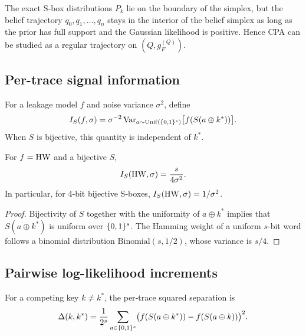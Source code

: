 The exact S‑box distributions $P_k$ lie on the boundary of the simplex, but
the belief trajectory $q_0,q_1,\ldots,q_n$ stays in the interior of the belief
simplex as long as the prior has full support and the Gaussian likelihood is
positive.  Hence CPA can be studied as a regular trajectory on $(Q,g_F^{(Q)})$.

\subsection{Per-trace signal information}\label{subsec:per-trace}

\begin{definition}\label{def:per-trace}
  For a leakage model $f$ and noise variance $\sigma^2$, define
  \begin{equation}\label{eq:per-trace-def}
    I_S(f,\sigma) = \sigma^{-2}
    \operatorname{Var}_{a\sim\mathrm{Unif}(\{0,1\}^{s})}\bigl[f(S(a\oplus k^*))\bigr].
  \end{equation}
  When $S$ is bijective, this quantity is independent of $k^*$.
\end{definition}

\begin{proposition}\label{thm:per-trace}
  For $f = \mathrm{HW}$ and a bijective $S$,
  \begin{equation}\label{eq:hw-info}
    I_S(\mathrm{HW},\sigma) = \frac{s}{4\sigma^2}.
  \end{equation}
  In particular, for 4‑bit bijective S‑boxes, $I_S(\mathrm{HW},\sigma)=1/\sigma^2$.
\end{proposition}

\begin{proof}
  Bijectivity of $S$ together with the uniformity of $a\oplus k^*$ implies that
  $S(a\oplus k^*)$ is uniform over $\{0,1\}^{s}$.  The Hamming weight of a uniform
  $s$-bit word follows a binomial distribution $\mathrm{Binomial}(s,1/2)$, whose
  variance is $s/4$.
\end{proof}

\subsection{Pairwise log-likelihood increments}\label{subsec:pairwise-llr}

For a competing key $k \neq k^*$, the per‑trace squared separation is
\begin{equation}\label{eq:delta-k}
  \Delta(k,k^*) = \frac{1}{2^s} \sum_{a\in\{0,1\}^{s}}
  \bigl(f(S(a\oplus k^*)) - f(S(a\oplus k))\bigr)^2.
\end{equation}

